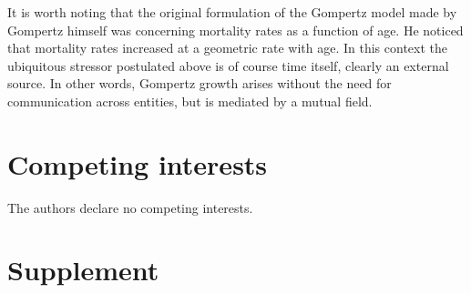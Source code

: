 \documentclass{article}
\begin{document}
It is worth noting that the original formulation of the Gompertz model made by Gompertz himself was concerning mortality rates as a function of age. He noticed that mortality rates increased at a geometric rate with age. In this context the ubiquitous stressor postulated above is of course time itself, clearly an external source. In other words, Gompertz growth arises without the need for communication across entities, but is mediated by a mutual field.

\section*{Competing interests}
The authors declare no competing interests.


\section*{Supplement}


\end{document}
